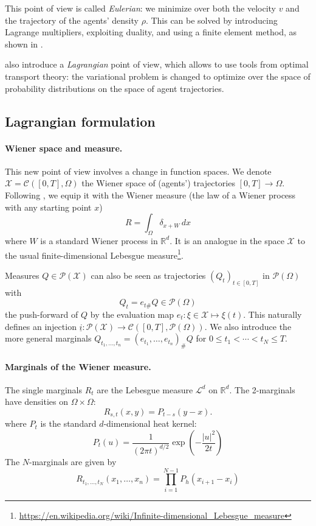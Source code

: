 \documentclass[11pt]{article}
\newcommand{\RR}{\mathbb{R}}
\newcommand{\calC}{\mathcal{C}}
\newcommand{\calP}{\mathcal{P}}
\newcommand{\calX}{\mathcal{X}}
\numberwithin{equation}{section}
\theoremstyle{definition}
\begin{document}
This point of view is called \textit{Eulerian}: we minimize over both the velocity $v$ and the trajectory of the agents' density $\rho$. This can be solved by introducing Lagrange multipliers, exploiting duality, and using a finite element method, as shown in \cite{benamou:hal-01295299}.

\textcite{benamou:hal-01295299,benamou2018entropy} also introduce a \textit{Lagrangian} point of view, which allows to use tools from optimal transport theory: the variational problem is changed to optimize over the space of probability distributions on the space of agent trajectories.


\subsection{Lagrangian formulation}

\paragraph{Wiener space and measure.} 
This new point of view involves a change in function spaces. We denote $\calX = \calC([0,T], \Omega)$ the Wiener space of (agents') trajectories $[0,T] \rightarrow\Omega$. Following \cites{benamou:hal-01295299,benamou2015lagrangian}, we equip it with the Wiener measure (the law of a Wiener process with any starting point $x$)
\[
   	R = \int_\Omega \delta_{x + W}\,dx
\]
where $W$ is a standard Wiener process in $\RR^d$. It is an analogue in the space $\calX$ to the usual finite-dimensional Lebesgue measure\footnote{\url{https://en.wikipedia.org/wiki/Infinite-dimensional_Lebesgue_measure}}.
  	
Measures $Q \in \calP(\calX)$ can also be seen as trajectories $(Q_t)_{t\in[0,T]}$ in $\calP(\Omega)$ with
\[
   	Q_t = e_{t\#}Q \in \calP(\Omega)
\]
the push-forward of $Q$ by the evaluation map $e_t\colon \xi\in\calX\longmapsto \xi(t)$. This naturally defines an injection $\underline{i} \colon \calP(\calX) \rightarrow \calC([0,T], \calP(\Omega))$. We also introduce the more general marginals $Q_{t_1,\ldots,t_n} = (e_{t_1},\ldots, e_{t_n})_\# Q$ for $0\leq t_1 < \cdots < t_N \leq T$.

\paragraph{Marginals of the Wiener measure.} The single marginals $R_t$ are the Lebesgue measure $\mathcal{L}^d$ on $\RR^d$. The 2-marginals have densities on $\Omega\times \Omega$:
\begin{equation}\label{eq:2MarginWienerMeasure}
   	R_{s,t}(x,y) = P_{t-s}(y-x).
\end{equation}
where $P_t$ is the standard $d$-dimensional heat kernel:
\begin{equation}
	P_t(u) =
	\frac{1}{(2\pi t)^{d/2}} \exp\left(-\frac{|u|^2}{2t}\right)
\end{equation}
The $N$-marginals are given by
\begin{equation}
	R_{t_1,\ldots,t_N}(x_1,\ldots,x_n) = 
	\prod_{i=1}^{N-1}
	P_{h}(x_{i+1}-x_i)
\end{equation}
\end{document}
